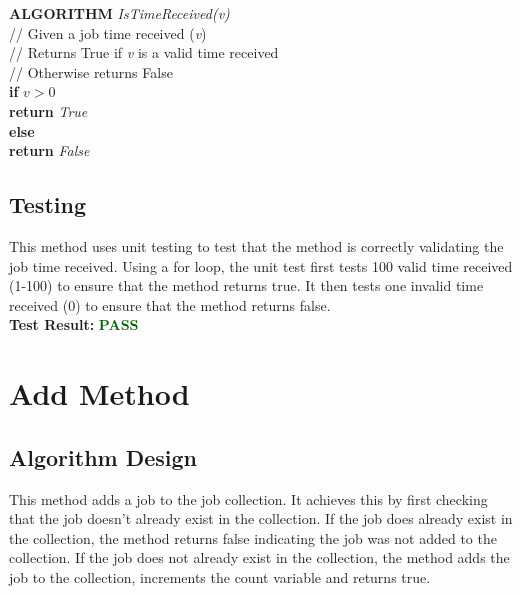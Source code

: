 \documentclass[12pt,a4paper]{article}
\begin{document}
			\textbf{ALGORITHM} \textit{IsTimeReceived(v)}\\
			\null\hspace{1cm}// Given a job time received (\textit{v})\\
			\null\hspace{1cm}// Returns True if \textit{v} is a valid time received\\
			\null\hspace{1cm}// Otherwise returns False\\
			\null\hspace{1cm}\textbf{if} \textit{$v > 0$}\\
			\null\hspace{2cm}\textbf{return} \textit{True}\\
			\null\hspace{1cm}\textbf{else}\\
			\null\hspace{2cm}\textbf{return} \textit{False}
		
		\subsection{Testing}
			This method uses unit testing to test that the method is correctly validating the 
			job time received. Using a for loop, the unit test first tests 100 valid time received 
			(1-100) to ensure that the method returns true. It then tests one invalid time received 
			(0) to ensure that the method returns false.\\

			\textbf{Test Result:} \textbf{\textcolor{darkgreen}{PASS}}\\

	\newpage
			
	\section{Add Method}
		\subsection{Algorithm Design}
			This method adds a job to the job collection. It achieves this by first checking that the job 
			doesn't already exist in the collection. If the job does already exist in the collection, the 
			method returns false indicating the job was not added to the collection. If the job does not 
			already exist in the collection, the method adds the job to the collection, increments the count 
			variable and returns true.\\
\end{document}
